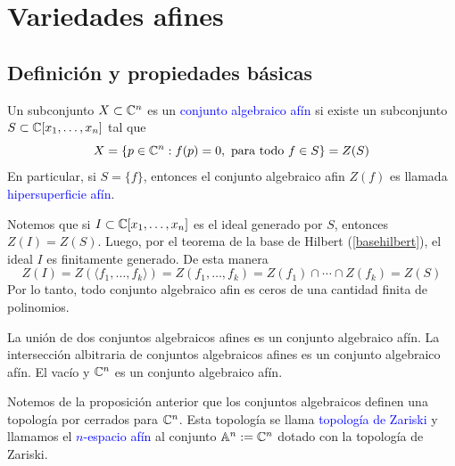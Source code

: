 \section{Variedades afines}

\subsection{Definición y propiedades básicas}

    \begin{definition}
        Un subconjunto $X\subset \mathbb{C}^n$ es un \textcolor{blue}{conjunto algebraico afín} si existe un subconjunto $S\subset\mathbb{C}[x_1,\dots,x_n]$ tal que
        \begin{equation*}
            X=\{p\in\mathbb{C}^n:f(p)=0,\text{ para todo }f\in S\}=Z(S)
        \end{equation*}
        En particular, si $S=\{f\}$, entonces el conjunto algebraico afin $Z(f)$ es llamada \textcolor{blue}{hipersuperficie afín}.
    \end{definition}

    \begin{remark}\label{hipersuperficies}
        Notemos que si $I\subset\mathbb{C}[x_1,\dots,x_n]$ es el ideal generado por $S$, entonces $Z(I)=Z(S)$. Luego, por el teorema de la base de Hilbert (\ref{basehilbert}), el ideal $I$ es finitamente generado. De esta manera
        \begin{equation*}
            Z(I)=Z(\langle f_1,\dots,f_k\rangle)=Z( f_1,\dots,f_k)=Z(f_1)\cap\cdots\cap Z(f_k)=Z(S)
        \end{equation*}
        Por lo tanto, todo conjunto algebraico afin es ceros de una cantidad finita de polinomios.
    \end{remark}
    
    \begin{propo}
        La unión de dos conjuntos algebraicos afines es un conjunto algebraico afín. La intersección albitraria de conjuntos algebraicos afines es un conjunto algebraico afín. El vacío y $\mathbb{C}^n$ es un conjunto algebraico afín.
    \end{propo}

    \begin{remark}\label{zariskiafin}
        Notemos de la proposición anterior que los conjuntos algebraicos definen una topología por cerrados para $\mathbb{C}^{n}$. Esta topología se llama \textcolor{blue}{topología de Zariski} y llamamos el \textcolor{blue}{$n$-espacio afín} al conjunto $\mathbb{A}^n:=\mathbb{C}^n$ dotado con la topología de Zariski.\\
    \end{remark}

